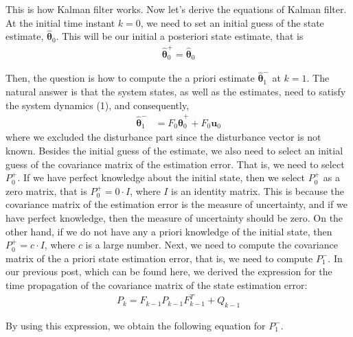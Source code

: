 This is how Kalman filter works. Now let's derive the equations of Kalman filter. At the initial time instant $k=0$, we need to set an initial guess of the state estimate, $\hat{\boldsymbol{\theta}}_{0}$. This will be our initial a posteriori state estimate, that is
\begin{align*}
	\hat{\boldsymbol{\theta}}_{0}^{+}=\hat{\boldsymbol{\theta}}_{0}
\end{align*}

Then, the question is how to compute the a priori estimate $\hat{\boldsymbol{\theta}}_{1}^{-}$ at $k=1$. The natural answer is that the system states, as well as the estimates, need to satisfy the system dynamics (1), and consequently,
\begin{align*}
	\hat{\boldsymbol{\theta}}_{1}^{-}& =F_{0}\hat{\boldsymbol{\theta}}_{0}^{+}+F_{0}\mathbf{u}_{0}
\end{align*}
where we excluded the disturbance part since the disturbance vector is not known. Besides the initial guess of the estimate, we also need to select an initial guess of the covariance matrix of the estimation error. That is, we need to select $P_{0}^{+}$. If we have perfect knowledge about the initial state, then we select $P_{0}^{+}$ as a zero matrix, that is $P_{0}^{+}=0\cdot I$, where $I$ is an identity matrix. This is because the covariance matrix of the estimation error is the measure of uncertainty, and if we have perfect knowledge, then the measure of uncertainty should be zero. On the other hand, if we do not have any a priori knowledge of the initial state, then $P_{0}^{+}=c\cdot I$, where $c$ is a large number. Next, we need to compute the covariance matrix of the a priori state estimation error, that is, we need to compute $P_{1}^{-}$. In our previous post, which can be found here, we derived the expression for the time propagation of the covariance matrix of the state estimation error:
\begin{align*}
	P_{k}=F_{k-1}P_{k-1}F_{k-1}^{T}+Q_{k-1}
\end{align*}



By using this expression, we obtain the following equation for $P_{1}^{-}$.


